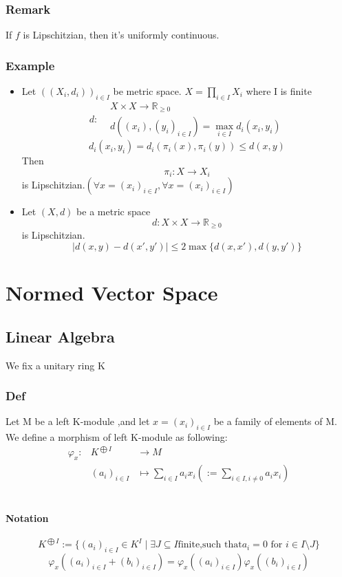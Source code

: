 \documentclass{book}
\begin{document}
\section{Remark}
If $f$ is Lipschitzian, then it's uniformly continuous.
\section{Example}
\begin{itemize}
    \item Let $((X_i,d_i))_{i\in I}$ be metric space. $X=\prod\limits_{i\in I}X_i$ where I is finite$$d:\begin{aligned}
    &X\times X\rightarrow\mathbb{R}_{\geq 0}\\
    &d((x_i),(y_i)_{i\in I})=\max\limits_{i\in I}d_i(x_i,y_i)
    \end{aligned} $$
    $$d_i(x_i,y_i)=d_i(\pi_i(x),\pi_i(y))\leq d(x,y)$$
    Then $$\pi_i:X\rightarrow X_i$$ is Lipschitzian.$\left(\forall x=(x_i)_{i\in I},\forall x=(x_i)_{i\in I}\right)$
    \item Let $(X,d)$ be a metric space$$d:X\times X\rightarrow\mathbb{R}_{\geq 0}$$ is Lipschitzian.$$\lvert d(x,y)-d(x',y')\rvert\leq 2\max\{d(x,x'),d(y,y')\}$$
\end{itemize}
\part{Normed Vector Space}
\chapter{Linear Algebra}
We fix a unitary ring K
\section{Def}
Let M be a left K-module ,and let $x=(x_i)_{i\in I}$ be a family of elements of M. We define a morphism of left K-module as following:
$$\begin{aligned}
\varphi_x:  &K^{\bigoplus I}&\rightarrow  M\\
&(a_i)_{i\in I}&\mapsto \sum\limits_{i\in I}a_ix_i(:=\sum\limits_{i\in I,i\not=0}a_ix_i)
\end{aligned}$$\
\subsection{Notation}
$$K^{\bigoplus I}:=\{(a_i)_{i\in I}\in K^I\mid\exists J\subseteq I \text{finite,such that} a_i=0 \text{ for }i\in I\setminus J\}$$
$$\varphi_x((a_i)_{i\in I}+(b_i)_{i\in I})=\varphi_x((a_i)_{i\in I})\varphi_x((b_i)_{i\in I})$$
\end{document}
